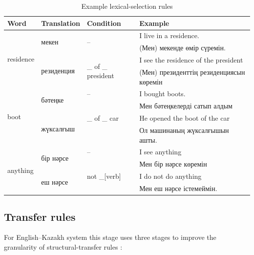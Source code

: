 \documentclass[11pt]{article}
\begin{document}
\begin{table}
 \centering
 \begin{tabular}{|l|l|l|l|}
    \hline
    \textbf{Word} & \textbf{Translation} & \textbf{Condition} & \textbf{Example} \\
    \hline
    \multirow{4}{*}{residence} & \multirow{2}{*}{мекен}      & \multirow{2}{*}{--} & I live in a residence. \\
                               &                             &                     & (Мен) мекенде өмір сүремін. \\
                               & \multirow{2}{*}{резиденция} & \multirow{2}{*}{\_ of \_ president} & I see the residence of the president \\ 
                               &                             &                                     & (Мен) президенттің резиденциясын көремін \\
    \hline
    \multirow{4}{*}{boot} & \multirow{2}{*}{бәтеңке} & -- & I bought boots. \\
                          &                          &     &  Мен бәтеңкелерді сатып алдым \\

                          & \multirow{2}{*}{жүксалғыш} & \_ of \_ car &  He opened the boot of the car  \\ 
                          &           &              & Ол машинаның жүксалғышын ашты. \\
    \hline
    \multirow{4}{*}{anything} & \multirow{2}{*}{бір нәрсе} & -- & I see anything \\ 
                              &           &    & Мен бір нәрсе көремін \\
                              & \multirow{2}{*}{еш нәрсе} & not \_[verb] & I do not do anything \\ 
                              &          &             &  Мен еш нәрсе істемеймін. \\

    \hline
 \end{tabular}
  \caption{Example lexical-selection rules}
  \label{table:lexsel}
\end{table}

\subsection{Transfer rules}

For English–Kazakh system this stage uses three stages to improve the granularity of structural-transfer 
rules \citep{sundetova13b}:
\end{document}
